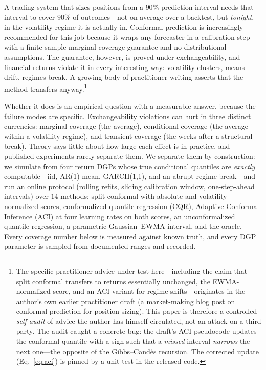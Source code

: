 \documentclass[11pt]{article}
\begin{document}
A trading system that sizes positions from a $90\%$ prediction interval needs
that interval to cover $90\%$ of outcomes---not on average over a backtest, but
\emph{tonight}, in the volatility regime it is actually in. Conformal
prediction \citep{vovk2005algorithmic,shafer2008tutorial} is increasingly
recommended for this job because it wraps any forecaster in a calibration step
with a finite-sample marginal coverage guarantee and no distributional
assumptions. The guarantee, however, is proved under exchangeability, and
financial returns violate it in every interesting way: volatility clusters,
means drift, regimes break. A growing body of practitioner writing asserts
that the method transfers anyway.\footnote{The specific practitioner advice
under test here---including the claim that split conformal transfers to
returns essentially unchanged, the EWMA-normalized score, and an ACI variant
for regime shifts---originates in the author's own earlier practitioner draft
(a market-making blog post on conformal prediction for position sizing). This
paper is therefore a controlled \emph{self-audit} of advice the author has
himself circulated, not an attack on a third party. The audit caught a
concrete bug: the draft's ACI pseudocode updates the conformal quantile with a
sign such that a \emph{missed} interval \emph{narrows} the next one---the
opposite of the Gibbs--Cand\`es recursion. The corrected update
(Eq.~\ref{eq:aci}) is pinned by a unit test in the released code.}

Whether it does is an empirical question with a measurable answer, because the
failure modes are specific. Exchangeability violations can hurt in three
distinct currencies: marginal coverage (the average), conditional coverage
(the average within a volatility regime), and transient coverage (the weeks
after a structural break). Theory says little about how large each effect is
in practice, and published experiments rarely separate them. We separate them
by construction: we simulate from four return DGPs whose true conditional
quantiles are \emph{exactly} computable---iid, AR(1) mean, GARCH(1,1), and an
abrupt regime break---and run an online protocol (rolling refits, sliding
calibration window, one-step-ahead intervals) over $14$ methods: split
conformal with absolute and volatility-normalized scores, conformalized
quantile regression (CQR), Adaptive Conformal Inference (ACI) at four learning
rates on both scores, an unconformalized quantile regression, a parametric
Gaussian--EWMA interval, and the oracle. Every coverage number below is
measured against known truth, and every DGP parameter is sampled from
documented ranges and recorded.
\end{document}
